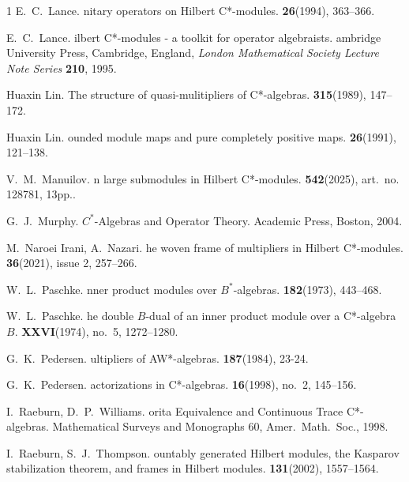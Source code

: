 \documentclass{amsart}
\theoremstyle{definition}
\begin{document}
\begin{thebibliography}{1}
{\sc E.~C.~Lance}.
nitary operators on {H}ilbert {C}*-modules.
 {\bf 26}(1994), 363--366.

{\sc E.~C.~Lance}.
ilbert {C}*-modules - a toolkit for operator algebraists.
ambridge {U}niversity {P}ress, {C}ambridge, {E}ngland, {\em London Mathematical Society Lecture Note Series} {\bf 210}, 1995.

{\sc Huaxin Lin}.
\newblock The structure of quasi-mulitipliers of C*-algebras.
 {\bf 315}(1989), 147--172.

{\sc Huaxin Lin}.
ounded module maps and pure completely positive maps.
 {\bf 26}(1991), 121--138.

{\sc V.~M.~Manuilov}.
n large submodules in {H}ilbert {C}*-modules.
 {\bf 542}(2025), art.~no. 128781, 13pp..

{\sc G.~J.~Murphy}.
\newblock ${C}^{*}$-{A}lgebras and {O}perator {T}heory.
\newblock Academic Press, Boston, 2004.

{\sc M.~Naroei Irani, A.~Nazari}.
he woven frame of multipliers in {H}ilbert {C}*-modules.
 {\bf 36}(2021), issue 2, 257--266.

{\sc W.~L.~Paschke}.
nner product modules over ${B}^{*}$-algebras.
 {\bf 182}(1973), 443--468.

{\sc W.~L.~Paschke}.
he double $B$-dual of an inner product module over a {C}*-algebra $B$.
 {\bf XXVI}(1974), no.~5, 1272--1280.

{\sc G.~K.~Pedersen}.
ultipliers of {AW}*-algebras.
 {\bf 187}(1984), 23-24.

{\sc G.~K.~Pedersen}.
actorizations in {C}*-algebras.
 {\bf 16}(1998), no.~2, 145--156.

{\sc I.~Raeburn, D.~P.~Williams}.
orita {E}quivalence and {C}ontinuous {T}race {C}*-algebras.
\newblock Mathematical Surveys and Monographs 60, Amer.~Math.~Soc., 1998.

{\sc I.~Raeburn, S.~J.~Thompson}. 
ountably generated {H}ilbert modules, the {K}asparov stabilization theorem, and frames in {H}ilbert modules. 
 {\bf 131}(2002),  1557--1564.


\end{thebibliography}
\end{document}
